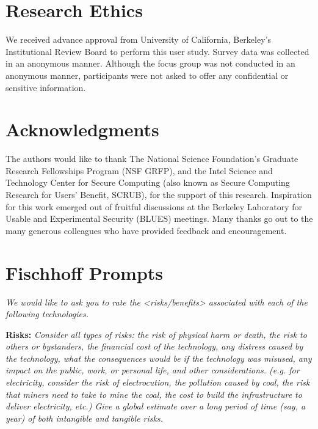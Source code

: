 \documentclass{acm_proc_article-sp}
\begin{document}

\section{Research Ethics} 
We received advance approval from University of California, Berkeley's Institutional Review Board to perform this user study. Survey data was collected in an anonymous manner. Although the focus group was not conducted in an anonymous manner, participants were not asked to offer any confidential or sensitive information. 

\section{Acknowledgments}
The authors would like to thank The National Science Foundation's Graduate Research Fellowships Program (NSF GRFP), and the Intel Science and Technology Center for Secure Computing (also known as  Secure Computing Research for Users' Benefit, SCRUB), for the support of this research. Inspiration for this work emerged out of fruitful discussions at the Berkeley Laboratory for Usable and Experimental Security (BLUES) meetings. Many thanks go out to the many generous colleagues who have provided feedback and encouragement.







\appendix
\section{Fischhoff Prompts}
\label{sec:prompt} 

\textit{We would like to ask you to rate the <risks/benefits> associated with each of the following technologies.}

{\bf Risks:} \textit{Consider all types of risks: the risk of physical harm or death, the risk to others or bystanders, the financial cost of the technology, any distress caused by the technology, what the consequences would be if the technology was misused, any impact on the public, work, or personal life, and other considerations. (e.g. for electricity, consider the risk of electrocution, the pollution caused by coal, the risk that miners need to take to mine the coal, the cost to build the infrastructure to deliver electricity, etc.) Give a global estimate over a long period of time (say, a year) of both intangible and tangible risks.} \\[-.6cm]
\end{document}
